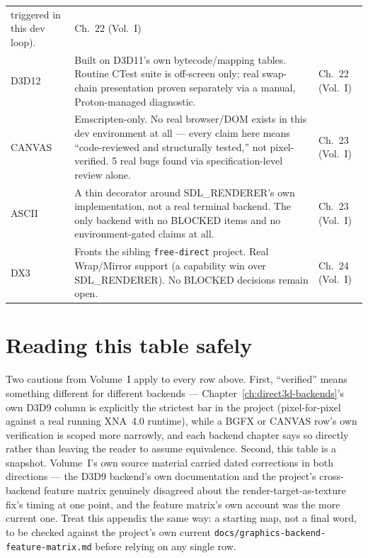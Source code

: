 \begin{center}
\begin{tabular}{lp{7.6cm}l}
  triggered in this dev loop). & Ch.~22 (Vol.~I) \\
D3D12 & Built on D3D11's own bytecode/mapping tables. Routine CTest suite is off-screen only;
  real swap-chain presentation proven separately via a manual, Proton-managed diagnostic. & Ch.~22 (Vol.~I) \\
CANVAS & Emscripten-only. No real browser/DOM exists in this dev environment at all --- every
  claim here means ``code-reviewed and structurally tested,'' not pixel-verified. 5 real bugs
  found via specification-level review alone. & Ch.~23 (Vol.~I) \\
ASCII & A thin decorator around SDL\_RENDERER's own implementation, not a real terminal
  backend. The only backend with no BLOCKED items and no environment-gated claims at all. & Ch.~23 (Vol.~I) \\
DX3 & Fronts the sibling \texttt{free-direct} project. Real Wrap/Mirror support (a capability
  win over SDL\_RENDERER). No BLOCKED decisions remain open. & Ch.~24 (Vol.~I) \\
\bottomrule
\end{tabular}
\end{center}

\section{Reading this table safely}

Two cautions from Volume~I apply to every row above. First, ``verified'' means something
different for different backends --- Chapter~\ref{ch:direct3d-backends}'s own D3D9 column is
explicitly the strictest bar in the project (pixel-for-pixel against a real running XNA~4.0
runtime), while a BGFX or CANVAS row's own verification is scoped more narrowly, and each
backend chapter says so directly rather than leaving the reader to assume equivalence.
Second, this table is a snapshot. Volume~I's own source material carried dated corrections in
both directions --- the D3D9 backend's own documentation and the project's cross-backend
feature matrix genuinely disagreed about the render-target-as-texture fix's timing at one
point, and the feature matrix's own account was the more current one. Treat this appendix the
same way: a starting map, not a final word, to be checked against the project's own current
\texttt{docs/graphics-backend-feature-matrix.md} before relying on any single row.
